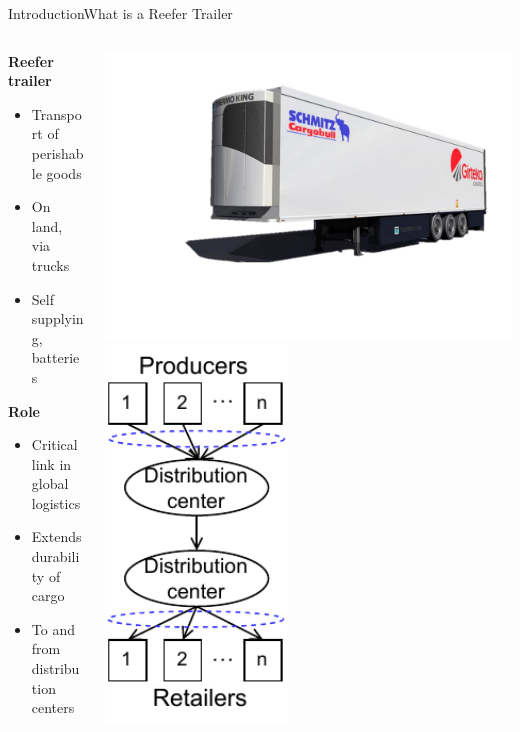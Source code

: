 \begin{frame}{Introduction}{What is a Reefer Trailer}
 		\begin{columns}
 		\begin{column}{.5\textwidth}
 			\textbf{Reefer trailer}
	 			\begin{itemize}
		 			\item Transport of perishable goods
		 			\item On land, via trucks
		 			\item Self supplying, batteries			
		 		\end{itemize} \bigskip\bigskip
 			\textbf{Role} 
		 		\begin{itemize}
		 			\item Critical link in global logistics
		 			\item Extends durability of cargo
		 			\item To and from distribution centers			
		 		\end{itemize}
 		\end{column}
 		\begin{column}{.5\textwidth}
 				\raggedleft
 				\includegraphics[width=.95\textwidth]{../Graphics/3d_draw_trailer.pdf}
				\centering
				\includegraphics[width=0.45\textwidth]{../Graphics/Transportation_networks.pdf}

\end{column}
\end{columns}
\end{frame}
